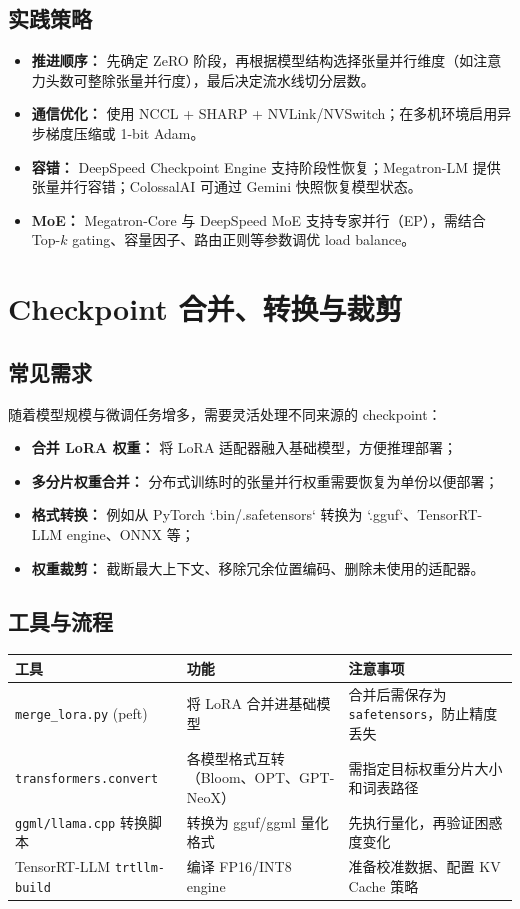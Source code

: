 \documentclass[UTF8,zihao=-4]{ctexart}
\begin{document}
\subsection{实践策略}
\begin{itemize}
  \item \textbf{推进顺序：} 先确定 ZeRO 阶段，再根据模型结构选择张量并行维度（如注意力头数可整除张量并行度），最后决定流水线切分层数。
  \item \textbf{通信优化：} 使用 NCCL + SHARP + NVLink/NVSwitch；在多机环境启用异步梯度压缩或 1-bit Adam。
  \item \textbf{容错：} DeepSpeed Checkpoint Engine 支持阶段性恢复；Megatron-LM 提供张量并行容错；ColossalAI 可通过 Gemini 快照恢复模型状态。
  \item \textbf{MoE：} Megatron-Core 与 DeepSpeed MoE 支持专家并行（EP），需结合 Top-$k$ gating、容量因子、路由正则等参数调优 load balance。
\end{itemize}

\section{Checkpoint 合并、转换与裁剪}
\subsection{常见需求}
随着模型规模与微调任务增多，需要灵活处理不同来源的 checkpoint：
\begin{itemize}
  \item \textbf{合并 LoRA 权重：} 将 LoRA 适配器融入基础模型，方便推理部署；
  \item \textbf{多分片权重合并：} 分布式训练时的张量并行权重需要恢复为单份以便部署；
  \item \textbf{格式转换：} 例如从 PyTorch `.bin/.safetensors` 转换为 `.gguf`、TensorRT-LLM engine、ONNX 等；
  \item \textbf{权重裁剪：} 截断最大上下文、移除冗余位置编码、删除未使用的适配器。
\end{itemize}

\subsection{工具与流程}
\begin{longtable}{p{3cm}p{4cm}p{6cm}}
\toprule
工具 & 功能 & 注意事项 \\
\midrule
\texttt{merge\_lora.py} (peft) & 将 LoRA 合并进基础模型 & 合并后需保存为 \texttt{safetensors}，防止精度丢失 \\
\texttt{transformers.convert} & 各模型格式互转（Bloom、OPT、GPT-NeoX） & 需指定目标权重分片大小和词表路径 \\
\texttt{ggml/llama.cpp} 转换脚本 & 转换为 gguf/ggml 量化格式 & 先执行量化，再验证困惑度变化 \\
TensorRT-LLM \texttt{trtllm-build} & 编译 FP16/INT8 engine & 准备校准数据、配置 KV Cache 策略 \\
\bottomrule
\end{longtable}
\end{document}
